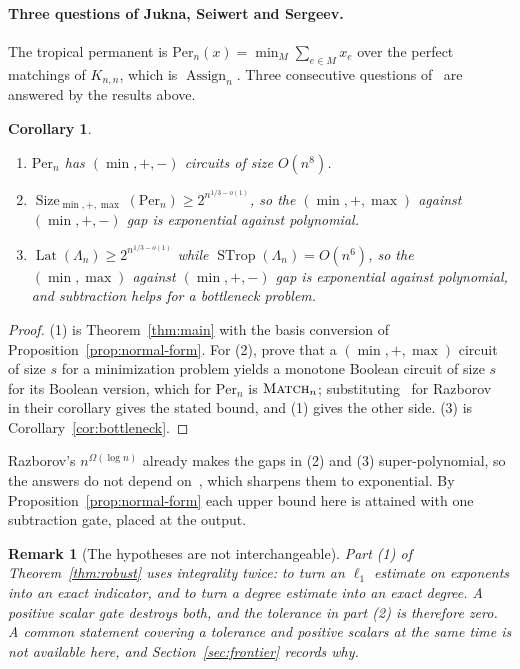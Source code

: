 \documentclass[11pt]{article}
\newtheorem{corollary}[theorem]{Corollary}
\newtheorem{remark}[theorem]{Remark}
\newcommand{\Assign}{\operatorname{Assign}}
\begin{document}
\paragraph{Three questions of Jukna, Seiwert and Sergeev.}
The tropical permanent is
$\mathrm{Per}_n(x)=\min_M\sum_{e\in M}x_e$ over the perfect matchings of
$K_{n,n}$, which is $\Assign_n$.  Three consecutive questions
of~\cite{jukna-seiwert-sergeev20} are answered by the results above.

\begin{corollary}
\label{cor:jss}
\begin{enumerate}
  \item $\mathrm{Per}_n$ has $(\min,+,-)$ circuits of size $O(n^{8})$.
  \item $\operatorname{Size}_{\min,+,\max}(\mathrm{Per}_n)\ge2^{n^{1/3-o(1)}}$,
        so the $(\min,+,\max)$ against $(\min,+,-)$ gap is exponential against
        polynomial.
  \item $\operatorname{Lat}(\Lambda_n)\ge2^{n^{1/3-o(1)}}$ while
        $\operatorname{STrop}(\Lambda_n)=O(n^{6})$, so the $(\min,\max)$ against
        $(\min,+,-)$ gap is exponential against polynomial, and subtraction helps
        for a bottleneck problem.
\end{enumerate}
\end{corollary}

\begin{proof}
(1) is Theorem~\ref{thm:main} with the basis conversion of
Proposition~\ref{prop:normal-form}.  For (2), \cite{jukna-seiwert-sergeev20}
prove that a $(\min,+,\max)$ circuit of size $s$ for a minimization problem
yields a monotone Boolean circuit of size $s$ for its Boolean version, which for
$\mathrm{Per}_n$ is $\textsc{Match}_n$; substituting~\cite{cgrss26} for
Razborov~\cite{razborov85} in their corollary gives the stated bound, and (1)
gives the other side.  (3) is Corollary~\ref{cor:bottleneck}.
\end{proof}

Razborov's $n^{\Omega(\log n)}$ already makes the gaps in (2) and (3)
super-polynomial, so the answers do not depend on~\cite{cgrss26}, which sharpens
them to exponential.  By Proposition~\ref{prop:normal-form} each upper bound
here is attained with one subtraction gate, placed at the output.

\begin{remark}[The hypotheses are not interchangeable]
\label{rem:not-combinable}
Part (1) of Theorem~\ref{thm:robust} uses integrality twice: to turn an
$\ell_1$ estimate on exponents into an exact indicator, and to turn a degree
estimate into an exact degree.  A positive scalar gate destroys both, and the
tolerance in part (2) is therefore zero.  A common statement covering a
tolerance and positive scalars at the same time is not available here, and
Section~\ref{sec:frontier} records why.
\end{remark}
\end{document}
